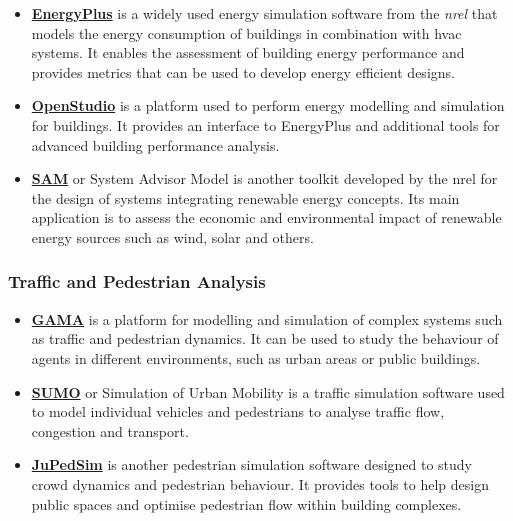 \documentclass[a4paper, 12pt]{report}
\begin{document}
\begin{itemize}
\item \href{https://github.com/NREL/EnergyPlus}{\textbf{EnergyPlus}} is a widely used energy simulation software from the \textit{\acrfull{nrel}} that models the energy consumption of buildings in combination with \acrshort{hvac} systems. It enables the assessment of building energy performance and provides metrics that can be used to develop energy efficient designs.

\item \href{https://github.com/NREL/OpenStudio}{\textbf{OpenStudio}} is a platform used to perform energy modelling and simulation for buildings. It provides an interface to EnergyPlus and additional tools for advanced building performance analysis.

\item \href{https://github.com/NREL/SAM}{\textbf{SAM}} or System Advisor Model is another toolkit developed by the \acrshort{nrel} for the design of systems integrating renewable energy concepts. Its main application is to assess the economic and environmental impact of renewable energy sources such as wind, solar and others.

\end{itemize}

\subsubsection{Traffic and Pedestrian Analysis}\label{subsec:traffic-and-pedestrian-analysis}

\begin{itemize}

\item \href{https://github.com/gama-platform/gama}{\textbf{GAMA}} is a platform for modelling and simulation of complex systems such as traffic and pedestrian dynamics. It can be used to study the behaviour of agents in different environments, such as urban areas or public buildings.

\item \href{https://github.com/eclipse/sumo}{\textbf{SUMO}} or Simulation of Urban Mobility is a traffic simulation software used to model individual vehicles and pedestrians to analyse traffic flow, congestion and transport.

\item \href{https://github.com/PedestrianDynamics/jupedsim}{\textbf{JuPedSim}} is another pedestrian simulation software designed to study crowd dynamics and pedestrian behaviour. It provides tools to help design public spaces and optimise pedestrian flow within building complexes.

\end{itemize}
\end{document}
